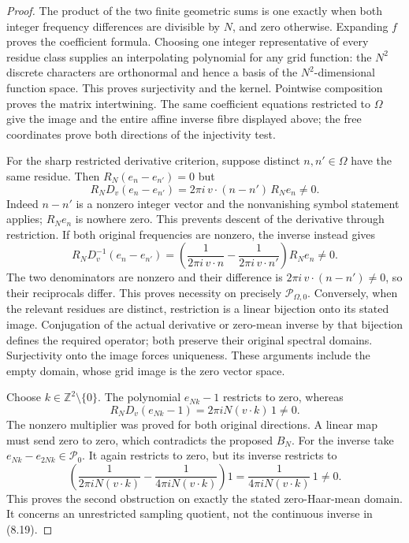 \begin{proof}
The product of the two finite geometric sums is one
exactly when both integer frequency differences are
divisible by $N$, and zero otherwise. Expanding $f$
proves the coefficient formula. Choosing one integer
representative of every residue class supplies an
interpolating polynomial for any grid function: the
$N^2$ discrete characters are orthonormal and hence a
basis of the $N^2$-dimensional function space. This
proves surjectivity and the kernel. Pointwise composition
proves the matrix intertwining. The same coefficient
equations restricted to $\Omega$ give the image and the
entire affine inverse fibre displayed above; the free
coordinates prove both directions of the injectivity test.

For the sharp restricted derivative criterion, suppose distinct
$n,n'\in\Omega$ have the same residue. Then
$R_N(e_n-e_{n'})=0$ but
\[
 R_ND_v(e_n-e_{n'})
   =2\pi i\,v\cdot(n-n')\,R_Ne_n\ne0.
\]
Indeed $n-n'$ is a nonzero integer vector and the nonvanishing
symbol statement applies; $R_Ne_n$ is nowhere zero. This
prevents descent of the derivative through restriction. If both
original frequencies are nonzero, the inverse instead gives
\[
 R_ND_v^{-1}(e_n-e_{n'})
  =\left(\frac1{2\pi i\,v\cdot n}
             -\frac1{2\pi i\,v\cdot n'}\right)R_Ne_n\ne0.
\]
The two denominators are nonzero and their difference is
$2\pi i\,v\cdot(n-n')\ne0$, so their reciprocals differ.
This proves necessity on precisely $\mathcal P_{\Omega,0}$.
Conversely, when the relevant residues are distinct,
restriction is a linear bijection onto its stated image.
Conjugation of the actual derivative or zero-mean inverse by
that bijection defines the required operator; both preserve
their original spectral domains. Surjectivity onto the image
forces uniqueness. These arguments include the empty domain,
whose grid image is the zero vector space.

Choose $k\in\mathbb Z^2\setminus\{0\}$. The polynomial
$e_{Nk}-1$ restricts to zero, whereas
\[
 R_ND_v(e_{Nk}-1)=2\pi iN(v\cdot k)\,1\ne0.
\]
The nonzero multiplier was proved for both original
directions. A linear map must send zero to zero, which
contradicts the proposed $B_N$. For the inverse take
$e_{Nk}-e_{2Nk}\in\mathcal P_0$. It again restricts to
zero, but its inverse restricts to
\[
 \left(\frac1{2\pi iN(v\cdot k)}
       -\frac1{4\pi iN(v\cdot k)}\right)1
 =\frac1{4\pi iN(v\cdot k)}\,1\ne0.
\]
This proves the second obstruction on exactly the stated
zero-Haar-mean domain. It concerns an unrestricted
sampling quotient, not the continuous inverse in (8.19).
\end{proof}

